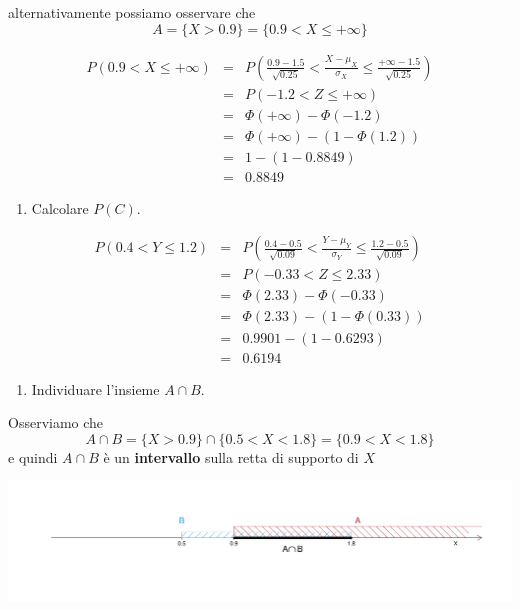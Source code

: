 \documentclass[
  11pt,
]{book}
\providecommand{\tightlist}{%
  \setlength{\itemsep}{0pt}\setlength{\parskip}{0pt}}
\theoremstyle{mytheoremstyle}
\theoremstyle{mydefstyle}
\begin{document}
alternativamente possiamo osservare che
\[A=\{X>0.9\}=\{0.9< X\leq +\infty \}\]

\begin{eqnarray*}
   P( 0.9 < X \leq  +\infty ) &=& P\left( \frac { 0.9  -  1.5 }{\sqrt{ 0.25 }} < \frac { X  -  \mu_X }{ \sigma_X } \leq \frac { +\infty  -  1.5 }{\sqrt{ 0.25 }}\right)  \\
              &=& P\left(  -1.2  < Z \leq  +\infty \right) \\
              &=& \Phi( +\infty )-\Phi( -1.2 )\\
              &=&  \Phi( +\infty )-(1-\Phi( 1.2 )) \\ &=&  1 -(1- 0.8849 ) \\ 
              &=&  0.8849 
   \end{eqnarray*}

\begin{enumerate}
\def\labelenumi{\arabic{enumi}.}
\setcounter{enumi}{2}
\tightlist
\item
  Calcolare \(P(C)\).
\end{enumerate}

\begin{eqnarray*}
   P( 0.4 < Y \leq  1.2 ) &=& P\left( \frac { 0.4  -  0.5 }{\sqrt{ 0.09 }} < \frac { Y  -  \mu_Y }{ \sigma_Y } \leq \frac { 1.2  -  0.5 }{\sqrt{ 0.09 }}\right)  \\
              &=& P\left(  -0.33  < Z \leq  2.33 \right) \\
              &=& \Phi( 2.33 )-\Phi( -0.33 )\\
              &=&  \Phi( 2.33 )-(1-\Phi( 0.33 )) \\ &=&  0.9901 -(1- 0.6293 ) \\ 
              &=&  0.6194 
   \end{eqnarray*}

\begin{enumerate}
\def\labelenumi{\arabic{enumi}.}
\setcounter{enumi}{3}
\tightlist
\item
  Individuare l'insieme \(A\cap B\).
\end{enumerate}

Osserviamo che
\[A\cap B=\{X>0.9\}\cap\{0.5<X<1.8\}= \{0.9<X<1.8\} \]
e quindi \(A\cap B\) è un \textbf{intervallo} sulla retta di supporto di \(X\)

\begin{center}\includegraphics{Appunti_di_Statistica_2025_files/figure-latex/07d-Esercizi-Normale-5,-1} \end{center}
\end{document}

